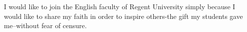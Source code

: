 \documentclass{article}%
\begin{document}
I would like to join the English faculty of Regent University simply because I would like to share my faith in order to inspire others-the gift my students gave me--without fear of censure.

\end{document}
